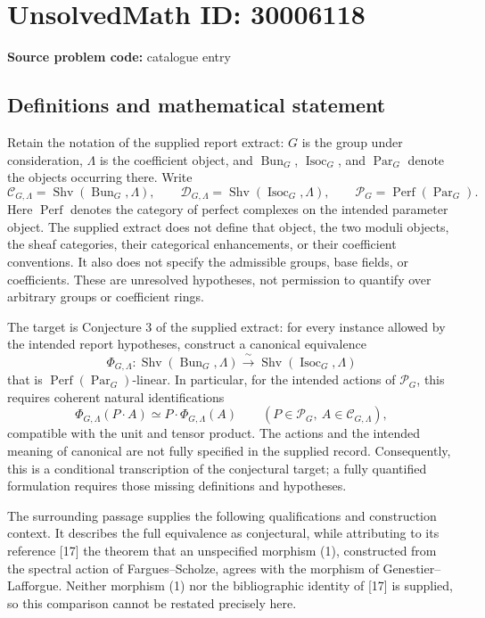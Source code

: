 \documentclass[11pt]{article}
\begin{document}
\section*{UnsolvedMath ID: 30006118}
\textbf{Source problem code:} catalogue entry
\subsection{Definitions and mathematical statement}
Retain the notation of the supplied report extract: \(G\) is the group under consideration, \(\Lambda\) is the coefficient object, and \(\operatorname{Bun}_G\), \(\operatorname{Isoc}_G\), and \(\operatorname{Par}_G\) denote the objects occurring there. Write
\[
\mathcal C_{G,\Lambda}=\operatorname{Shv}(\operatorname{Bun}_G,\Lambda),\qquad
\mathcal D_{G,\Lambda}=\operatorname{Shv}(\operatorname{Isoc}_G,\Lambda),\qquad
\mathcal P_G=\operatorname{Perf}(\operatorname{Par}_G).
\]
Here \(\operatorname{Perf}\) denotes the category of perfect complexes on the intended parameter object. The supplied extract does not define that object, the two moduli objects, the sheaf categories, their categorical enhancements, or their coefficient conventions. It also does not specify the admissible groups, base fields, or coefficients. These are unresolved hypotheses, not permission to quantify over arbitrary groups or coefficient rings.

The target is Conjecture 3 of the supplied extract: for every instance allowed by the intended report hypotheses, construct a canonical equivalence
\[
\Phi_{G,\Lambda}\colon
\operatorname{Shv}(\operatorname{Bun}_G,\Lambda)
\xrightarrow{\ \sim\ }
\operatorname{Shv}(\operatorname{Isoc}_G,\Lambda)
\]
that is \(\operatorname{Perf}(\operatorname{Par}_G)\)-linear. In particular, for the intended actions of \(\mathcal P_G\), this requires coherent natural identifications
\[
\Phi_{G,\Lambda}(P\cdot A)\simeq P\cdot\Phi_{G,\Lambda}(A)
\qquad(P\in\mathcal P_G,\ A\in\mathcal C_{G,\Lambda}),
\]
compatible with the unit and tensor product. The actions and the intended meaning of canonical are not fully specified in the supplied record. Consequently, this is a conditional transcription of the conjectural target; a fully quantified formulation requires those missing definitions and hypotheses.

The surrounding passage supplies the following qualifications and construction context. It describes the full equivalence as conjectural, while attributing to its reference [17] the theorem that an unspecified morphism (1), constructed from the spectral action of Fargues--Scholze, agrees with the morphism of Genestier--Lafforgue. Neither morphism (1) nor the bibliographic identity of [17] is supplied, so this comparison cannot be restated precisely here.
\end{document}
